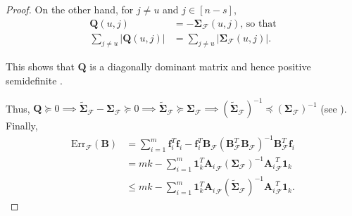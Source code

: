 \documentclass[journal,draftcls,onecolumn]{IEEEtran}
\theoremstyle{mystyle}
\newcommand{\bfB}{\mathbf{B}}
\newcommand{\cF}{\mathcal{F}}
\begin{document}
\begin{proof}
On the other hand, for $j \ne u$ and $j \in [n-s]$,
\begin{align*}
\mathbf{Q}(u,j) &= -\mathbf{\Sigma}_{\mathcal{F}}(u,j) \text{, so that}\\
\sum_{j \ne u} |\mathbf{Q}(u,j)| &=  \sum_{j \ne u} |\mathbf{\Sigma}_{\mathcal{F}}(u,j)|.
\end{align*}

This shows that $\mathbf{Q}$ is a diagonally dominant matrix and hence positive semidefinite \cite{horn2012matrix}.


Thus, 
$\mathbf{Q} \succeq 0 \implies \tilde{\mathbf{\Sigma}}_{\mathcal{F}} - \mathbf{\Sigma}_{\mathcal{F}} \succeq 0 \implies \tilde{\mathbf{\Sigma}}_{\mathcal{F}} \succeq \mathbf{\Sigma}_{\mathcal{F}} \implies (\tilde{\mathbf{\Sigma}}_{\mathcal{F}})^{-1} \preceq (\mathbf{\Sigma}_{\mathcal{F}})^{-1}$ (see \cite{bhatia2009positive}). Finally,
\begin{align*}
\text{Err}_{\mathcal{F}}(\mathbf{B}) 
& = \sum_{i =1}^m \mathbf{f}_i^T \mathbf{f}_i - \mathbf{f}_i^T \bfB_{\cF}(\bfB_{\cF}^T\bfB_{\cF})^{-1}\bfB_{\cF}^T\mathbf{f}_i \\
& = mk -  \sum_{i =1}^m \mathbf{1}_k^T {\mathbf{A}_i}_{\mathcal{F}}(\mathbf{\Sigma}_{\mathcal{F}})^{-1}  {\mathbf{A}_i}_{\mathcal{F}}^T\mathbf{1}_k\\
& \le mk -  \sum_{i =1}^m \mathbf{1}_k^T {\mathbf{A}_i}_{\mathcal{F}}(\tilde{\mathbf{\Sigma}}_{\mathcal{F}})^{-1}  {\mathbf{A}_i}_{\mathcal{F}}^T\mathbf{1}_k.
\end{align*}
\end{proof}
\end{document}

